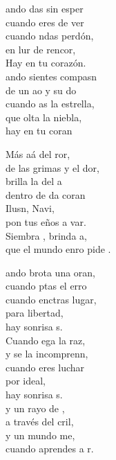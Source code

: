 \begin{cancion}%
	ando das sin esper \\
	cuando eres de ver \\
	cuando ndas perdón,\\
	en lur de rencor,\\
	Hay  en tu corazón.\\
	ando sientes compasn\\
	de un ao y su do \\
	cuando as la estrella,\\
	que olta la niebla,\\
	hay  en tu coran\jump\\
	\begin{chorus}%
		Más aá del ror,\\
		de las grimas y el dor,\\
		brilla la  del a \\
		dentro de da coran\\
		Ilusn, Navi,\\
		pon tus eños a var.\\
		Siembra , brinda a,\\
		que el mundo enro pide .\jump\\
	\end{chorus}%
	ando brota una oran,\\
	cuando ptas el erro \\
	cuando enctras lugar,\\
	para  libertad,\\
	hay  sonrisa s.\\
	Cuando ega la raz,\\
	y se la incomprenn,\\
	cuando eres luchar\\
	por  ideal,\\
	hay  sonrisa s.\\
	\jump
	y un rayo de ,\\
	a través del cril,   \\
	y un mundo me,\\
	cuando aprendes a r.\\
\end{cancion}%
